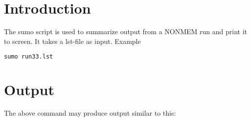
\setlength{\evensidemargin}{0pt}
\setlength{\oddsidemargin}{0pt}




\maketitle


\section{Introduction}
The sumo script is used to summarize output from a NONMEM run and print it to screen. It takes a lst-file as input.
Example
\begin{verbatim}
sumo run33.lst
\end{verbatim}


\section{Output}

The above command may produce output similar to this:

